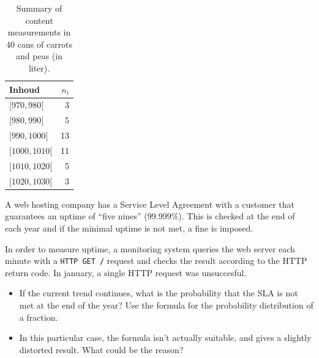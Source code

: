 \begin{table}
  \centering
  \begin{tabular}{lr}
    \toprule
    Inhoud & $n_{i}$ \\
    \midrule
    $[970,980[$ & 3 \\
    $[980,990[$ & 5 \\
    $[990,1000[$ & 13 \\
    $[1000,1010[$ & 11 \\ 
    $[1010,1020[$ & 5 \\
    $[1020,1030[$ & 3 \\
    \bottomrule
  \end{tabular}
  \caption{Summary of content measurements in 40 cans of carrots and peas (in liter).}
  \label{tab:Steekproefwaarden}
\end{table}

\begin{exercise}
  A web hosting company has a Service Level Agreement with a customer that guarantees an uptime of ``five nines'' (99.999\%). This is checked at the end of each year and if the minimal uptime is not met, a fine is imposed.
  
  In order to measure uptime, a monitoring system queries the web server each minute with a \texttt{HTTP GET /} request and checks the result according to the HTTP return code. In january, a single HTTP request was unsuccesful.
  
  \begin{itemize}
    \item If the current trend continues, what is the probability that the SLA is not met at the end of the year? Use the formula for the probability distribution of a fraction.
    \item In this particular case, the formula isn't actually suitable, and gives a slightly distorted result. What could be the reason?
  \end{itemize}
\end{exercise}